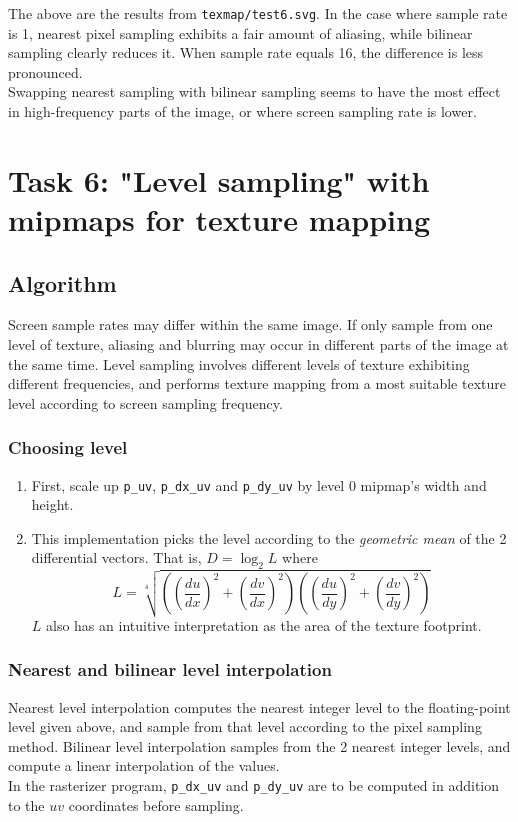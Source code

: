\documentclass[11pt]{article}
\begin{document}
The above are the results from \verb|texmap/test6.svg|. In the case where sample rate is 1, nearest pixel sampling exhibits a fair amount of aliasing, while bilinear sampling clearly reduces it. When sample rate equals 16, the difference is less pronounced.\\Swapping nearest sampling with bilinear sampling seems to have the most effect in high-frequency parts of the image, or where screen sampling rate is lower.

\newpage
\section{Task 6: "Level sampling" with mipmaps for texture mapping}
\subsection{Algorithm}
Screen sample rates may differ within the same image. If only sample from one level of texture, aliasing and blurring may occur in different parts of the image at the same time. Level sampling involves different levels of texture exhibiting different frequencies, and performs texture mapping from a most suitable texture level according to screen sampling frequency.\\
\subsubsection{Choosing level}\begin{enumerate}
    \item First, scale up \verb|p_uv|, \verb|p_dx_uv| and \verb|p_dy_uv| by level 0 mipmap's width and height.
    \item This implementation picks the level according to the \textit{geometric mean} of the 2 differential vectors. That is, $D=\log_2{L}$ where $$L=\sqrt[4]{((\frac{du}{dx})^2+(\frac{dv}{dx})^2)((\frac{du}{dy})^2+(\frac{dv}{dy})^2)}$$ $L$ also has an intuitive interpretation as the area of the texture footprint. 
\end{enumerate}
\subsubsection{Nearest and bilinear level interpolation}
Nearest level interpolation computes the nearest integer level to the floating-point level given above, and sample from that level according to the pixel sampling method. Bilinear level interpolation samples from the 2 nearest integer levels, and compute a linear interpolation of the values.\\In the rasterizer program, \verb|p_dx_uv| and \verb|p_dy_uv| are to be computed in addition to the $uv$ coordinates before sampling.
\end{document}
